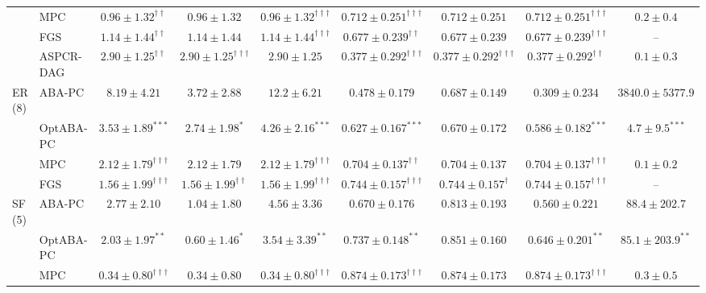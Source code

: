 \begin{table}[t]
{\begin{tabular}{llccccccc}
 & MPC & $\mathbf{0.96\pm1.32}^{\dagger\dagger}$ & $0.96\pm1.32$ & $\mathbf{0.96\pm1.32}^{\dagger\dagger\dagger}$ & $\mathbf{0.712\pm0.251}^{\dagger\dagger\dagger}$ & $0.712\pm0.251$ & $\mathbf{0.712\pm0.251}^{\dagger\dagger\dagger}$ & $0.2\pm0.4$\\
 & FGS & $\mathbf{1.14\pm1.44}^{\dagger\dagger}$ & $1.14\pm1.44$ & $\mathbf{1.14\pm1.44}^{\dagger\dagger\dagger}$ & $\mathbf{0.677\pm0.239}^{\dagger\dagger}$ & $0.677\pm0.239$ & $\mathbf{0.677\pm0.239}^{\dagger\dagger\dagger}$ & --\\
 & ASPCR-DAG & $2.90\pm1.25^{\dagger\dagger}$ & $2.90\pm1.25^{\dagger\dagger\dagger}$ & $2.90\pm1.25$ & $0.377\pm0.292^{\dagger\dagger\dagger}$ & $0.377\pm0.292^{\dagger\dagger\dagger}$ & $0.377\pm0.292^{\dagger\dagger}$ & $0.1\pm0.3$\\
\midrule
ER (8) & ABA-PC & $8.19\pm4.21$ & $3.72\pm2.88$ & $12.2\pm6.21$ & $0.478\pm0.179$ & $0.687\pm0.149$ & $0.309\pm0.234$ & $3840.0\pm5377.9$\\
 & OptABA-PC & $\mathbf{3.53\pm1.89}^{***}$ & $\mathbf{2.74\pm1.98}^{*}$ & $\mathbf{4.26\pm2.16}^{***}$ & $\mathbf{0.627\pm0.167}^{***}$ & $0.670\pm0.172$ & $\mathbf{0.586\pm0.182}^{***}$ & $\mathbf{4.7\pm9.5}^{***}$\\
 & MPC & $\mathbf{2.12\pm1.79}^{\dagger\dagger\dagger}$ & $2.12\pm1.79$ & $\mathbf{2.12\pm1.79}^{\dagger\dagger\dagger}$ & $\mathbf{0.704\pm0.137}^{\dagger\dagger}$ & $0.704\pm0.137$ & $\mathbf{0.704\pm0.137}^{\dagger\dagger\dagger}$ & $0.1\pm0.2$\\
 & FGS & $\mathbf{1.56\pm1.99}^{\dagger\dagger\dagger}$ & $\mathbf{1.56\pm1.99}^{\dagger\dagger}$ & $\mathbf{1.56\pm1.99}^{\dagger\dagger\dagger}$ & $\mathbf{0.744\pm0.157}^{\dagger\dagger\dagger}$ & $\mathbf{0.744\pm0.157}^{\dagger}$ & $\mathbf{0.744\pm0.157}^{\dagger\dagger\dagger}$ & --\\
\midrule
SF (5) & ABA-PC & $2.77\pm2.10$ & $1.04\pm1.80$ & $4.56\pm3.36$ & $0.670\pm0.176$ & $0.813\pm0.193$ & $0.560\pm0.221$ & $88.4\pm202.7$\\
 & OptABA-PC & $\mathbf{2.03\pm1.97}^{**}$ & $\mathbf{0.60\pm1.46}^{*}$ & $\mathbf{3.54\pm3.39}^{**}$ & $\mathbf{0.737\pm0.148}^{**}$ & $0.851\pm0.160$ & $\mathbf{0.646\pm0.201}^{**}$ & $\mathbf{85.1\pm203.9}^{**}$\\
 & MPC & $\mathbf{0.34\pm0.80}^{\dagger\dagger\dagger}$ & $0.34\pm0.80$ & $\mathbf{0.34\pm0.80}^{\dagger\dagger\dagger}$ & $\mathbf{0.874\pm0.173}^{\dagger\dagger\dagger}$ & $0.874\pm0.173$ & $\mathbf{0.874\pm0.173}^{\dagger\dagger\dagger}$ & $0.3\pm0.5$\\

\end{tabular}}
\end{table}
